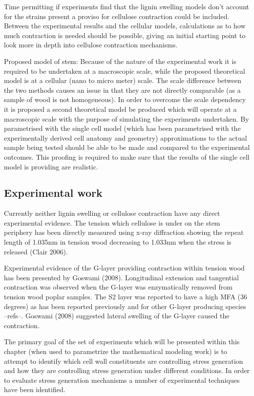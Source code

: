 \documentclass{article}
\begin{document}
Time permitting if experiments find that the lignin swelling models don't account
for the strains present a proviso for cellulose contraction could be included.
Between the experimental results and the cellular models, calculations as to how
much contraction is needed should be possible, giving an initial starting point
to look more in depth into cellulose contraction mechanisms.

Proposed model of stem:
Because of the nature of the experimental work it is required to be undertaken
at a macroscopic scale, while the proposed theoretical model is at a cellular
(nano to micro meter) scale. The scale difference between the two methods
causes an issue in that they are not directly comparable (as a sample of wood is not
homogeneous). In order to overcome the scale dependency it is proposed a second
theoretical model be produced which will operate at a macroscopic scale with the
purpose of simulating the experiments undertaken. By parametrised with the
single cell model (which has been parametrised with the experimentally derived
cell anatomy and geometry) approximations to the actual sample being tested
should be able to be made and compared to the experimental outcomes. This
proofing is required to make sure that the results of the single cell model is
providing are realistic.

\subsection{Experimental work}

Currently neither lignin swelling or cellulose contraction have any direct
experimental evidence. The tension which cellulose is under on the stem
periphery has been directly measured using x-ray diffraction showing the
repeat length of 1.035nm in tension wood decreasing to 1.033nm when the stress
is released (Clair 2006).

Experimental evidence of the G-layer providing contraction within tension wood
has been presented by Goswami (2008). Longitudinal extension and tangential
contraction was observed when the G-layer was enzymatically removed from
tension wood poplar samples. The S2 layer was reported to have a high MFA (36
degrees) as has been reported previously and for other G-layer producing species
--refs--. Goswami (2008) suggested lateral swelling of the G-layer caused the
contraction.

The primary goal of the set of experiments which will be presented within this
chapter (when used to parametrize the mathematical modeling work) is to attempt
to identify which cell wall constituents are controlling stress generation and
how they are controlling stress generation under different conditions. In order
to evaluate stress generation mechanisms a number of experimental techniques
have been identified.
\end{document}
